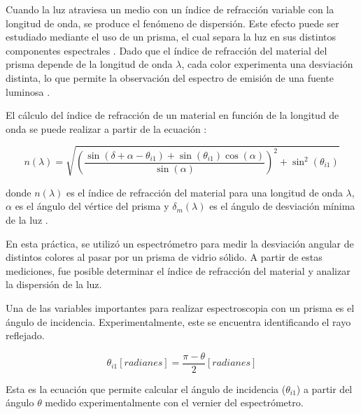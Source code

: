 \documentclass[article,12pt]{elsarticle}
\begin{document}
Cuando la luz atraviesa un medio con un índice de refracción variable con la longitud de onda, se produce el fenómeno de dispersión. Este efecto puede ser estudiado mediante el uso de un prisma, el cual separa la luz en sus distintos componentes espectrales \cite{beiser2003concepts}. Dado que el índice de refracción del material del prisma depende de la longitud de onda \( \lambda \), cada color experimenta una desviación distinta, lo que permite la observación del espectro de emisión de una fuente luminosa \cite{dispersionspectroscopy2025}.

El cálculo del índice de refracción de un material en función de la longitud de onda se puede realizar a partir de la ecuación \cite{Polyanskiy2020refractive}:

\begin{mdframed}
\begin{equation}
 \label{eq:nlambda}
 n(\lambda) = \sqrt{ \left( \frac{\sin(\delta + \alpha - \theta_{i1}) + \sin(\theta_{i1}) \cos(\alpha)}{\sin(\alpha)} \right)^2 + \sin^2(\theta_{i1}) }
\end{equation}
\end{mdframed}

donde \( n(\lambda) \) es el índice de refracción del material para una longitud de onda \( \lambda \), \( \alpha \) es el ángulo del vértice del prisma y \( \delta_{m}(\lambda) \) es el ángulo de desviación mínima de la luz \cite{dispersionspectroscopy2025}.

En esta práctica, se utilizó un espectrómetro para medir la desviación angular de distintos colores al pasar por un prisma de vidrio sólido. A partir de estas mediciones, fue posible determinar el índice de refracción del material y analizar la dispersión de la luz.

Una de las variables importantes para realizar espectroscopia con un prisma es el ángulo de incidencia. Experimentalmente, este se encuentra identificando el rayo reflejado.

\begin{mdframed}
 \begin{equation}
  \label{angulo de incidencia}
     \theta_{i1}[radianes] = \frac{\pi - \theta}{2}[radianes]
 \end{equation}
 \end{mdframed}
    Esta es la ecuación que permite calcular el ángulo de incidencia (\(\theta_{i1}\)) a partir del ángulo \(\theta\) medido experimentalmente con el vernier del espectrómetro.
\end{document}

